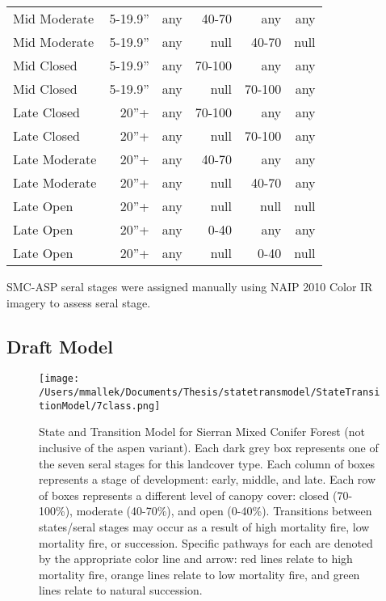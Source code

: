 \begin{table}[]
\begin{tabular}{@{}lrrrrr@{}}
Mid Moderate     & 5-19.9''        & any & 40-70  & any    & any  \\
Mid Moderate     & 5-19.9''        & any & null   & 40-70  & null \\
Mid Closed       & 5-19.9''        & any & 70-100 & any    & any  \\
Mid Closed       & 5-19.9''        & any & null   & 70-100 & any  \\
Late Closed      & 20''+           & any & 70-100 & any    & any  \\
Late Closed      & 20''+           & any & null   & 70-100 & any  \\
Late Moderate    & 20''+           & any & 40-70  & any    & any  \\
Late Moderate    & 20''+           & any & null   & 40-70  & any  \\
Late Open        & 20''+           & any & null   & null   & null \\
Late Open        & 20''+           & any & 0-40   & any    & any  \\
Late Open        & 20''+           & any & null   & 0-40   & null  \\ \bottomrule
\end{tabular}
\end{table}

SMC-ASP seral stages were assigned manually using NAIP 2010 Color IR imagery to assess seral stage.

\subsection*{Draft Model}
\begin{figure}[htbp]
\centering
\texttt{[image: /Users/mmallek/Documents/Thesis/statetransmodel/StateTransitionModel/7class.png]}
\caption{State and Transition Model for Sierran Mixed Conifer Forest (not inclusive of the aspen variant). Each dark grey box represents one of the seven seral stages for this landcover type. Each column of boxes represents a stage of development: early, middle, and late. Each row of boxes represents a different level of canopy cover: closed (70-100\%), moderate (40-70\%), and open (0-40\%). Transitions between states/seral stages may occur as a result of high mortality fire, low mortality fire, or succession. Specific pathways for each are denoted by the appropriate color line and arrow: red lines relate to high mortality fire, orange lines relate to low mortality fire, and green lines relate to natural succession.} 
\label{transmodel_smc}
\end{figure}

